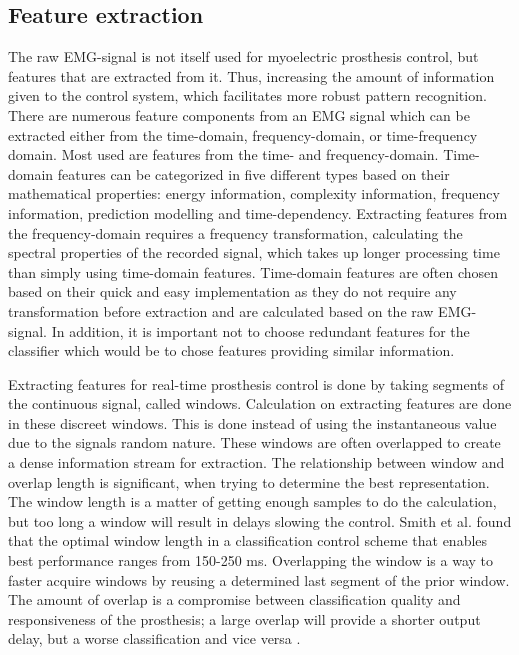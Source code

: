 
\subsection{Feature extraction} \label{sub:BG:featureExtraction} %

The raw EMG-signal is not itself used for myoelectric prosthesis control, but features that are extracted from it. Thus, increasing the amount of information given to the control system, which facilitates more robust pattern recognition. \\
There are numerous feature components from an EMG signal which can be extracted either from the time-domain, frequency-domain, or time-frequency domain. Most used are features from the time- and frequency-domain. Time-domain features can be categorized in five different types based on their mathematical properties: energy information, complexity information, frequency information, prediction modelling and time-dependency. Extracting features from the frequency-domain requires a frequency transformation, calculating the spectral properties of the recorded signal, which takes up longer processing time than simply using time-domain features. 
Time-domain features are often chosen based on their quick and easy implementation as they do not require any transformation before extraction and are calculated based on the raw EMG-signal. In addition, it is important not to choose redundant features for the classifier which would be to chose features providing similar information. \cite{Phiny2012} 

Extracting features for real-time prosthesis control is done by taking segments of the continuous signal, called windows. Calculation on extracting features are done in these discreet windows. This is done instead of using the instantaneous value due to the signals random nature. These windows are often overlapped to create a dense information stream for extraction. The relationship between window and overlap length is significant, when trying to determine the best representation. The window length is a matter of getting enough samples to do the calculation, but too long a window will result in delays slowing the control. Smith et al. \cite{Smith2014} found that the optimal window length in a classification control scheme that enables best performance ranges from 150-250 ms. Overlapping the window is a way to faster acquire windows by reusing a determined last segment of the prior window. The amount of overlap is a compromise between classification quality and responsiveness of the prosthesis; a large overlap will provide a shorter output delay, but a worse classification and vice versa \cite{Farrell2007}.
